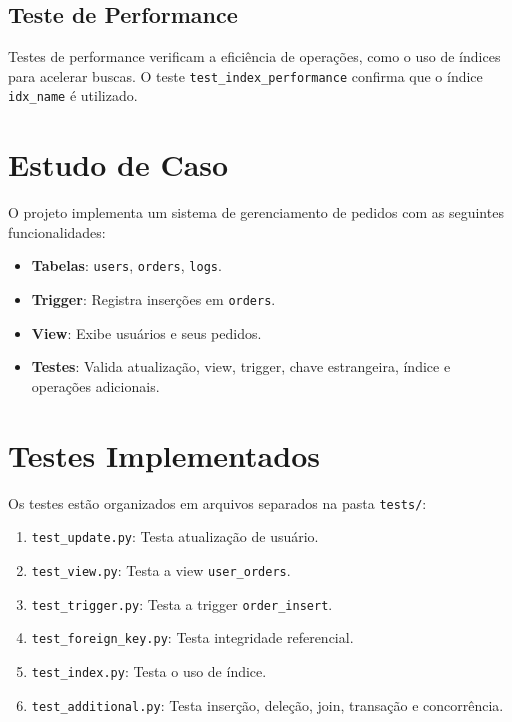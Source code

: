 \documentclass[a4paper,12pt]{article}
\begin{document}
\subsection{Teste de Performance}
Testes de performance verificam a eficiência de operações, como o uso de índices para acelerar buscas. O teste \texttt{test\_index\_performance} confirma que o índice \texttt{idx\_name} é utilizado.

\section{Estudo de Caso}
O projeto implementa um sistema de gerenciamento de pedidos com as seguintes funcionalidades:
\begin{itemize}
    \item \textbf{Tabelas}: \texttt{users}, \texttt{orders}, \texttt{logs}.
    \item \textbf{Trigger}: Registra inserções em \texttt{orders}.
    \item \textbf{View}: Exibe usuários e seus pedidos.
    \item \textbf{Testes}: Valida atualização, view, trigger, chave estrangeira, índice e operações adicionais.
\end{itemize}

\section{Testes Implementados}
Os testes estão organizados em arquivos separados na pasta \texttt{tests/}:
\begin{enumerate}
    \item \texttt{test\_update.py}: Testa atualização de usuário.
    \item \texttt{test\_view.py}: Testa a view \texttt{user\_orders}.
    \item \texttt{test\_trigger.py}: Testa a trigger \texttt{order\_insert}.
    \item \texttt{test\_foreign\_key.py}: Testa integridade referencial.
    \item \texttt{test\_index.py}: Testa o uso de índice.
    \item \texttt{test\_additional.py}: Testa inserção, deleção, join, transação e concorrência.
\end{enumerate}
\end{document}
